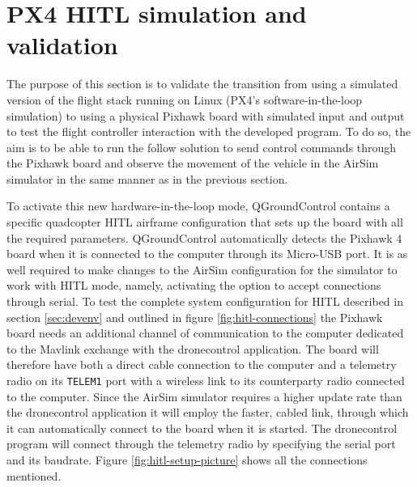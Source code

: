 \section{PX4 HITL simulation and validation}
\label{sec:test-4-hitl}


The purpose of this section is to validate the transition from using a simulated version of the flight stack running on Linux (PX4's software-in-the-loop simulation) to using a physical Pixhawk board with simulated input and output to test the flight controller interaction with the developed program.
To do so, the aim is to be able to run the follow solution to send control commands through the Pixhawk board and observe the movement of the vehicle in the AirSim simulator in the same manner as in the previous section.


To activate this new hardware-in-the-loop mode, QGroundControl contains a specific quadcopter HITL airframe configuration that sets up the board with all the required parameters.
QGroundControl automatically detects the Pixhawk 4 board when it is connected to the computer through its Micro-USB port.
It is as well required to make changes to the AirSim configuration for the simulator to work with HITL mode, namely, activating the option to accept connections through serial.
To test the complete system configuration for HITL described in section \ref{sec:devenv} and outlined in figure \ref{fig:hitl-connections} the Pixhawk board needs an additional channel of communication to the computer dedicated to the Mavlink exchange with the dronecontrol application.
The board will therefore have both a direct cable connection to the computer and a telemetry radio on its \verb|TELEM1| port with a wireless link to its counterparty radio connected to the computer.
Since the AirSim simulator requires a higher update rate than the dronecontrol application it will employ the faster, cabled link, through which it can automatically connect to the board when it is started.
The dronecontrol program will connect through the telemetry radio by specifying the serial port and its baudrate.
Figure \ref{fig:hitl-setup-picture} shows all the connections mentioned.


